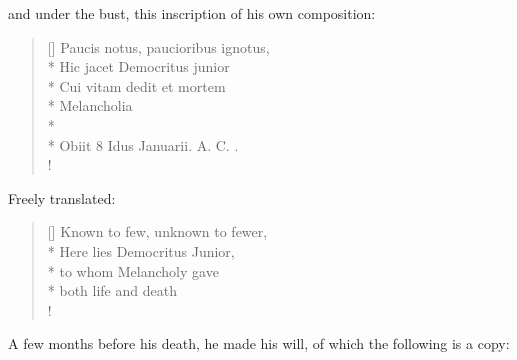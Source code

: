 and under the bust, this inscription of his own composition:

\begin{latin}
\settowidth{\versewidth}{Paucis notus, paucioribus ignotus,}
\begin{verse}[\versewidth]
Paucis notus, paucioribus ignotus,\\*
Hic jacet Democritus junior\\*
Cui vitam dedit et mortem\\*
Melancholia\\*
\hrulefill\\*
Obiit 8 Idus Januarii. A. C. {}.\\!
\end{verse}
\end{latin}

Freely translated:

\settowidth{\versewidth}{Known to few, unknown to fewer,}
\begin{verse}[\versewidth]
Known to few, unknown to fewer,\\*
Here lies Democritus Junior,\\*
to whom Melancholy gave\\*
both life and death\\!
\end{verse}


A few months before his death, he made his will, of which the following is a copy:
\\

